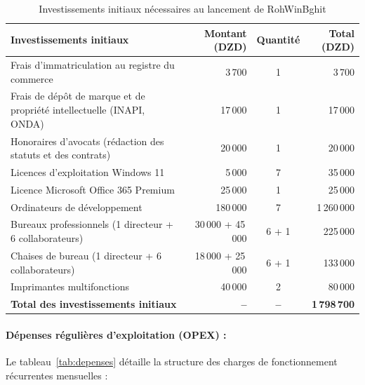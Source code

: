 \documentclass[11pt,a4paper]{article}
\begin{document}
\begin{table}[H]
\centering
\small
\begin{tabularx}{\textwidth}{|X|r|c|r|}
\hline
\rowcolor{bmclightgreen}
\textbf{Investissements initiaux} & \textbf{Montant (DZD)} & \textbf{Quantité} & \textbf{Total (DZD)} \\
\hline
Frais d'immatriculation au registre du commerce & 3\,700 & 1 & 3\,700 \\
\hline
Frais de dépôt de marque et de propriété intellectuelle (INAPI, ONDA) & 17\,000 & 1 & 17\,000 \\
\hline
Honoraires d'avocats (rédaction des statuts et des contrats) & 20\,000 & 1 & 20\,000 \\
\hline
Licences d'exploitation Windows 11 & 5\,000 & 7 & 35\,000 \\
\hline
Licence Microsoft Office 365 Premium & 25\,000 & 1 & 25\,000 \\
\hline
Ordinateurs de développement & 180\,000 & 7 & 1\,260\,000 \\
\hline
Bureaux professionnels (1 directeur + 6 collaborateurs) & 30\,000 + 45\,000 & 6 + 1 & 225\,000 \\
\hline
Chaises de bureau (1 directeur + 6 collaborateurs) & 18\,000 + 25\,000 & 6 + 1 & 133\,000 \\
\hline
Imprimantes multifonctions & 40\,000 & 2 & 80\,000 \\
\hline
\rowcolor{bmclightgreen}
\textbf{Total des investissements initiaux} & \textbf{--} & \textbf{--} & \textbf{1\,798\,700} \\
\hline
\end{tabularx}
\caption{Investissements initiaux nécessaires au lancement de RohWinBghit}
\label{tab:investissements}
\end{table}

\paragraph{Dépenses régulières d'exploitation (OPEX) :}
Le tableau~\ref{tab:depenses} détaille la structure des charges de fonctionnement récurrentes mensuelles :
\end{document}
